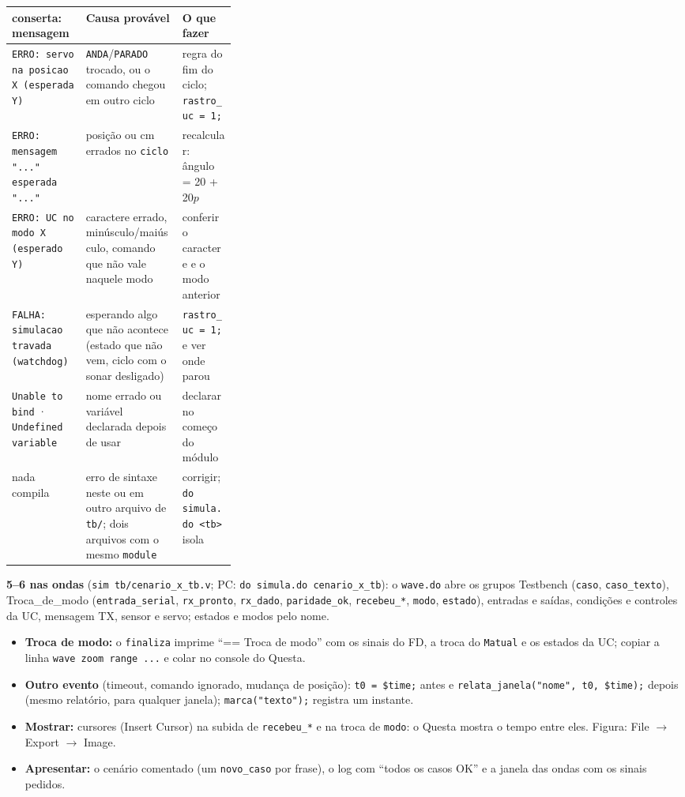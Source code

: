 \documentclass[9pt,a4paper]{extarticle}
\newcommand{\s}[1]{\texttt{#1}}          %
\begin{document}
\begin{tabularx}{\linewidth}{@{}>{\raggedright\arraybackslash}p{0.33\linewidth} Y Y@{}}
 conserta: mensagem & Causa provável & O que fazer \\
\midrule
\s{ERRO: servo na posicao X (esperada Y)} & \s{ANDA}/\s{PARADO} trocado, ou o comando chegou em outro ciclo & regra do fim do ciclo; \s{rastro\_uc = 1;} \\
\s{ERRO: mensagem "..." esperada "..."} & posição ou cm errados no \s{ciclo} & recalcular: ângulo = 20 + 20$p$ \\
\s{ERRO: UC no modo X (esperado Y)} & caractere errado, minúsculo/maiúsculo, comando que não vale naquele modo & conferir o caractere e o modo anterior \\
\s{FALHA: simulacao travada (watchdog)} & esperando algo que não acontece (estado que não vem, ciclo com o sonar desligado) & \s{rastro\_uc = 1;} e ver onde parou \\
\s{Unable to bind} · \s{Undefined variable} & nome errado ou variável declarada depois de usar & declarar no começo do módulo \\
nada compila & erro de sintaxe neste ou em outro arquivo de \s{tb/}; dois arquivos com o mesmo \s{module} & corrigir; \s{do simula.do <tb>} isola \\
\bottomrule
\end{tabularx}

\textbf{5--6 nas ondas} (\s{sim tb/cenario\_x\_tb.v}; PC: \s{do simula.do cenario\_x\_tb}):
o \s{wave.do} abre os grupos Testbench (\s{caso}, \s{caso\_texto}),
Troca\_de\_modo (\s{entrada\_serial}, \s{rx\_pronto}, \s{rx\_dado}, \s{paridade\_ok},
\s{recebeu\_*}, \s{modo}, \s{estado}), entradas e saídas, condições e controles da UC,
mensagem TX, sensor e servo; estados e modos pelo nome.
\begin{itemize}[before=\raggedright]
  \item \textbf{Troca de modo:} o \s{finaliza} imprime ``== Troca de modo'' com os sinais
        do FD, a troca do \s{Matual} e os estados da UC; copiar a linha
        \s{wave zoom range ...} e colar no console do Questa.
  \item \textbf{Outro evento} (timeout, comando ignorado, mudança de posição):
        \s{t0 = \$time;} antes e \s{relata\_janela("nome", t0, \$time);} depois (mesmo
        relatório, para qualquer janela); \s{marca("texto");} registra um instante.
  \item \textbf{Mostrar:} cursores (Insert Cursor) na subida de \s{recebeu\_*} e na troca
        de \s{modo}: o Questa mostra o tempo entre eles. Figura: File $\to$ Export $\to$ Image.
  \item \textbf{Apresentar:} o cenário comentado (um \s{novo\_caso} por frase), o log com
        ``todos os casos OK'' e a janela das ondas com os sinais pedidos.
\end{itemize}
\end{document}
